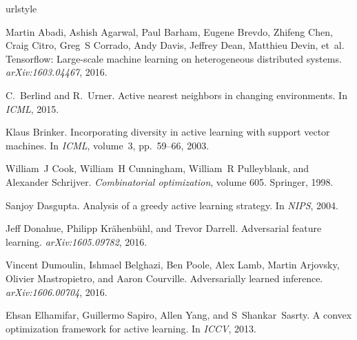 \documentclass{article} %
\begin{document}
\clearpage
\newpage

\begin{thebibliography}{40}
\providecommand{\natexlab}[1]{#1}
\providecommand{\url}[1]{\texttt{#1}}
\expandafter\ifx\csname urlstyle\endcsname\relax
  \providecommand{\doi}[1]{doi: #1}\else
  \providecommand{\doi}{doi: \begingroup \urlstyle{rm}\Url}\fi

Martin Abadi, Ashish Agarwal, Paul Barham, Eugene Brevdo, Zhifeng Chen, Craig
  Citro, Greg~S Corrado, Andy Davis, Jeffrey Dean, Matthieu Devin, et~al.
\newblock Tensorflow: Large-scale machine learning on heterogeneous distributed
  systems.
\newblock \emph{arXiv:1603.04467}, 2016.

C.~Berlind and R.~Urner.
\newblock Active nearest neighbors in changing environments.
\newblock In \emph{ICML}, 2015.

Klaus Brinker.
\newblock Incorporating diversity in active learning with support vector
  machines.
\newblock In \emph{ICML}, volume~3, pp.\  59--66, 2003.

William~J Cook, William~H Cunningham, William~R Pulleyblank, and Alexander
  Schrijver.
\newblock \emph{Combinatorial optimization}, volume 605.
\newblock Springer, 1998.

Sanjoy Dasgupta.
\newblock Analysis of a greedy active learning strategy.
\newblock In \emph{NIPS}, 2004.

Jeff Donahue, Philipp Kr{\"a}henb{\"u}hl, and Trevor Darrell.
\newblock Adversarial feature learning.
\newblock \emph{arXiv:1605.09782}, 2016.

Vincent Dumoulin, Ishmael Belghazi, Ben Poole, Alex Lamb, Martin Arjovsky,
  Olivier Mastropietro, and Aaron Courville.
\newblock Adversarially learned inference.
\newblock \emph{arXiv:1606.00704}, 2016.

Ehsan Elhamifar, Guillermo Sapiro, Allen Yang, and S~Shankar~Sasrty.
\newblock A convex optimization framework for active learning.
\newblock In \emph{ICCV}, 2013.


\end{thebibliography}
\end{document}
